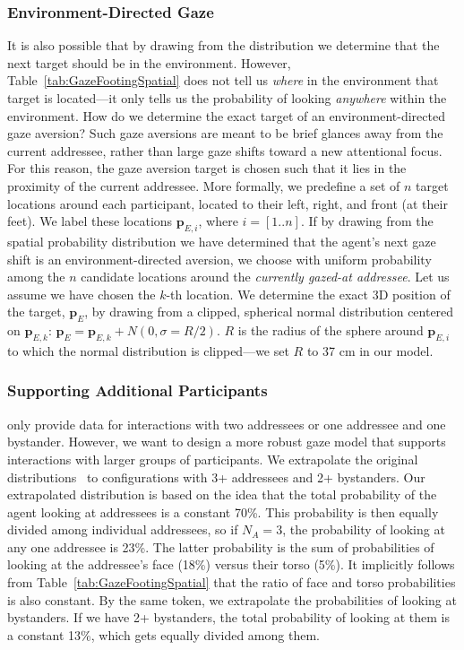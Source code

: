 \subsubsection{Environment-Directed Gaze}

It is also possible that by drawing from the distribution we determine that the next target should be in the environment. However, Table~\ref{tab:GazeFootingSpatial} does not tell us \emph{where} in the environment that target is located---it only tells us the probability of looking \emph{anywhere} within the environment. How do we determine the exact target of an environment-directed gaze aversion? Such gaze aversions are meant to be brief glances away from the current addressee, rather than large gaze shifts toward a new attentional focus. For this reason, the gaze aversion target is chosen such that it lies in the proximity of the current addressee. More formally, we predefine a set of $n$ target locations around each participant, located to their left, right, and front (at their feet). We label these locations $\mathbf{p}_{E,i}$, where $i = [1..n]$. If by drawing from the spatial probability distribution we have determined that the agent's next gaze shift is an environment-directed aversion, we choose with uniform probability among the $n$ candidate locations around the \emph{currently gazed-at addressee}. Let us assume we have chosen the $k$-th location. We determine the exact 3D position of the target, $\mathbf{p}_E$, by drawing from a clipped, spherical normal distribution centered on $\mathbf{p}_{E,k}$: $\mathbf{p}_E = \mathbf{p}_{E,k} + N(0, \sigma = R/2)$. $R$ is the radius of the sphere around $\mathbf{p}_{E,i}$ to which the normal distribution is clipped---we set $R$ to 37 cm in our model.

\subsubsection{Supporting Additional Participants}

\citet{mutlu2012conversational} only provide data for interactions with two addressees or one addressee and one bystander. However, we want to design a more robust gaze model that supports interactions with larger groups of participants. We extrapolate the original distributions~\citep{mutlu2012conversational} to configurations with 3+ addressees and 2+ bystanders. Our extrapolated distribution is based on the idea that the total probability of the agent looking at addressees is a constant 70\%. This probability is then equally divided among individual addressees, so if $N_A = 3$, the probability of looking at any one addressee is 23\%. The latter probability is the sum of probabilities of looking at the addressee's face (18\%) versus their torso (5\%). It implicitly follows from Table~\ref{tab:GazeFootingSpatial} that the ratio of face and torso probabilities is also constant. By the same token, we extrapolate the probabilities of looking at bystanders. If we have 2+ bystanders, the total probability of looking at them is a constant 13\%, which gets equally divided among them.

